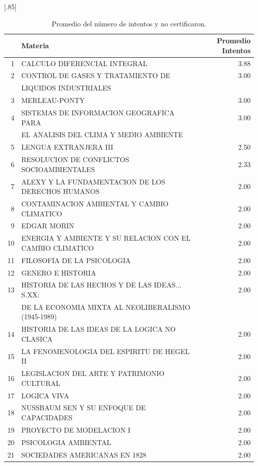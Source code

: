 \documentclass[12pt]{article}
\begin{document}
\begin{table}[ht]
\centering
\scalebox{0.75}[.85]{
\begin{tabular}{rlr}
  \hline
 & Materia & Promedio Intentos \\ 
  \hline
1 & CALCULO DIFERENCIAL INTEGRAL & 3.88 \\ 
  2 & CONTROL DE GASES Y TRATAMIENTO DE & 3.00 \\ 
   & LIQUIDOS INDUSTRIALES &  \\ 
  3 & MERLEAU-PONTY & 3.00 \\ 
  4 & SISTEMAS DE INFORMACION GEOGRAFICA PARA & 3.00 \\ 
  & EL ANALISIS DEL CLIMA Y MEDIO AMBIENTE &  \\ 
  5 & LENGUA EXTRANJERA III & 2.50 \\ 
  6 & RESOLUCION DE CONFLICTOS SOCIOAMBIENTALES & 2.33 \\ 
  7 & ALEXY Y LA FUNDAMENTACION DE LOS DERECHOS HUMANOS & 2.00 \\ 
  8 & CONTAMINACION AMBIENTAL Y CAMBIO CLIMATICO & 2.00 \\ 
  9 & EDGAR MORIN & 2.00 \\ 
  10 & ENERGIA Y AMBIENTE Y SU RELACION CON EL CAMBIO CLIMATICO & 2.00 \\ 
  11 & FILOSOFIA DE LA PSICOLOGIA & 2.00 \\ 
  12 & GENERO E HISTORIA & 2.00 \\ 
  13 & HISTORIA DE LAS HECHOS Y DE LAS IDEAS... S.XX: & 2.00 \\ 
 & DE LA ECONOMIA MIXTA AL NEOLIBERALISMO (1945-1989) &  \\ 
  14 & HISTORIA DE LAS IDEAS DE LA LOGICA NO CLASICA & 2.00 \\ 
  15 & LA FENOMENOLOGIA DEL ESPIRITU DE HEGEL II & 2.00 \\ 
  16 & LEGISLACION DEL ARTE Y PATRIMONIO CULTURAL & 2.00 \\ 
  17 & LOGICA VIVA & 2.00 \\ 
  18 & NUSSBAUM SEN Y SU ENFOQUE DE CAPACIDADES & 2.00 \\ 
  19 & PROYECTO DE MODELACION I & 2.00 \\ 
  20 & PSICOLOGIA AMBIENTAL & 2.00 \\ 
  21 & SOCIEDADES AMERICANAS EN 1828 & 2.00 \\ 
   \hline
\end{tabular}}
\caption{\label{Promedio_Intentos_No_Certificaron} Promedio del n\'umero  de intentos y no certificaron.}
\end{table}
\end{document}
